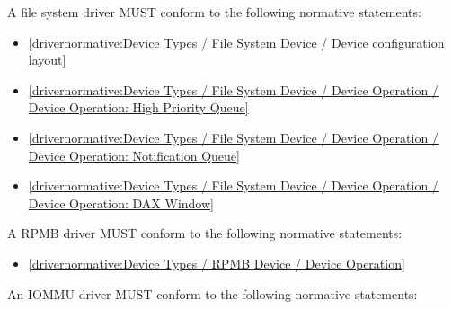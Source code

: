 A file system driver MUST conform to the following normative statements:

\begin{itemize}
\item \ref{drivernormative:Device Types / File System Device / Device configuration layout}
\item \ref{drivernormative:Device Types / File System Device / Device Operation / Device Operation: High Priority Queue}
\item \ref{drivernormative:Device Types / File System Device / Device Operation / Device Operation: Notification Queue}
\item \ref{drivernormative:Device Types / File System Device / Device Operation / Device Operation: DAX Window}
\end{itemize}

\label{sec:Conformance / Driver Conformance / RPMB Driver Conformance}

A RPMB driver MUST conform to the following normative statements:

\begin{itemize}
\item \ref{drivernormative:Device Types / RPMB Device / Device Operation}
\end{itemize}
\label{sec:Conformance / Driver Conformance / IOMMU Driver Conformance}

An IOMMU driver MUST conform to the following normative statements:

